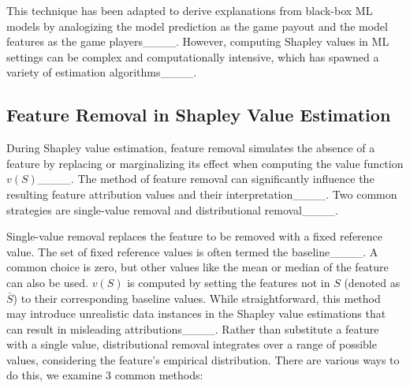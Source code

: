 This technique has been adapted to derive explanations from black-box ML models by analogizing the model prediction as the game payout and the model features as the game players____. However, computing Shapley values in ML settings can be complex and computationally intensive, which has spawned a variety of estimation algorithms____.

\subsection{Feature Removal in Shapley Value Estimation}


During Shapley value estimation, feature removal simulates the absence of a feature by replacing or marginalizing its effect when computing the value function \( v(S) \)____. The method of feature removal can significantly influence the resulting feature attribution values and their interpretation____. Two common strategies are single-value removal and distributional removal____.

Single-value removal replaces the feature to be removed with a fixed reference value. The set of fixed reference values is often termed the baseline____. A common choice is zero, but other values like the mean or median of the feature can also be used. \( v(S) \) is computed by setting the features not in \( S \) (denoted as \(\bar{S}\)) to their corresponding baseline values. While straightforward, this method may introduce unrealistic data instances in the Shapley value estimations that can result in misleading attributions____. Rather than substitute a feature with a single value, distributional removal integrates over a range of possible values, considering the feature's empirical distribution. There are various ways to do this, we examine 3 common methods:

